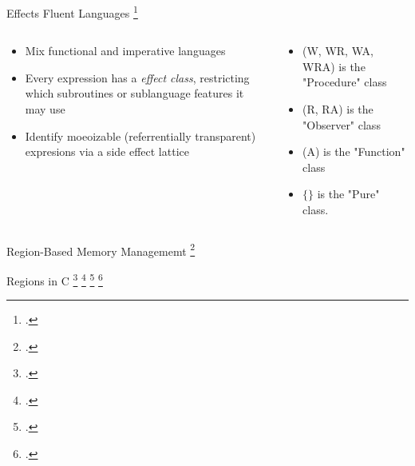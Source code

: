 \documentclass[aspectratio=169]{beamer}
\begin{document}
\begin{frame}{Effects}
    Fluent Languages \footcite{gifford_integrating_1986}
  \begin{columns}[T]
    \begin{column}{0.45\textwidth}
        \begin{itemize}
            \item Mix functional and imperative languages
            \item Every expression has a \emph{effect class}, restricting which subroutines or sublanguage features it may use
            \item Identify moeoizable (referrentially transparent) expresions via a side effect lattice
        \end{itemize}
    \end{column}

    \begin{column}{0.45\textwidth}
    \footnotesize{
        \begin{itemize}
            \item (W, WR, WA, WRA) is the "Procedure" class
            \item (R, RA) is the "Observer" class
            \item (A) is the "Function" class
            \item $\{\}$ is the "Pure" class.
        \end{itemize}
    }
    \end{column}
  \end{columns}
\end{frame}

\begin{frame}{Region-Based Memory Managememt}
    \footcite{tofte_region-based_1997}
\end{frame}

\begin{frame}{Regions in C}
    \footcite{gay_language_2001}
    \footcite{grossman_region-based_2002}
    \footcite{berger_reconsidering_2002}
    \footcite{shapiro_origins_2008}
\end{frame}
\end{document}
